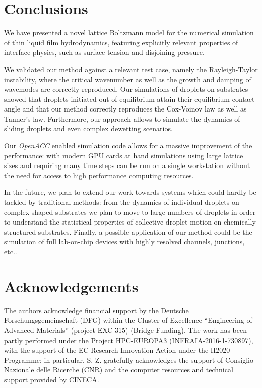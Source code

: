 \section{Conclusions}\label{sec:conclusions}
We have presented a novel lattice Boltzmann model for the numerical simulation of thin liquid film 
hydrodynamics, featuring explicitly relevant properties of interface physics, such as surface tension and disjoining pressure.

We validated our method against a relevant test case, namely the Rayleigh-Taylor instability, where the critical wavenumber as well as the growth and damping of wavemodes are correctly reproduced. Our simulations of droplets on substrates showed that droplets initiated out of equilibrium attain their equilibrium contact angle and that our method correctly reproduces the Cox-Voinov law as well as Tanner's law. Furthermore, our approach allows to simulate the dynamics of sliding droplets and even complex dewetting scenarios.

Our \textit{OpenACC} enabled simulation code allows for a massive improvement of the performance: with modern GPU cards at hand simulations using large lattice sizes and requiring many time steps can be run on a single workstation without the need for access to high performance computing resources.

In the future, we plan to extend our work towards systems which could hardly be tackled by traditional methods: from the dynamics of individual droplets on complex shaped substrates we plan to move to large numbers of droplets in order to understand the statistical properties of collective droplet motion on chemically structured substrates. Finally, a possible application of our method could be the simulation of full lab-on-chip devices with highly resolved channels, junctions, etc..
%

\section{Acknowledgements}\label{sec:ack}
The authors acknowledge financial support by the Deutsche 
Forschungsgemeinschaft (DFG) within the Cluster of Excellence ``Engineering of Advanced Materials'' (project EXC 315) (Bridge Funding). The work has been partly performed under the Project HPC-EUROPA3 (INFRAIA-2016-1-730897), with the support of the EC Research Innovation Action under the H2020 Programme; in particular, S. Z. gratefully acknowledges the support of Consiglio Nazionale delle Ricerche (CNR) and the computer resources and technical support provided by CINECA.

